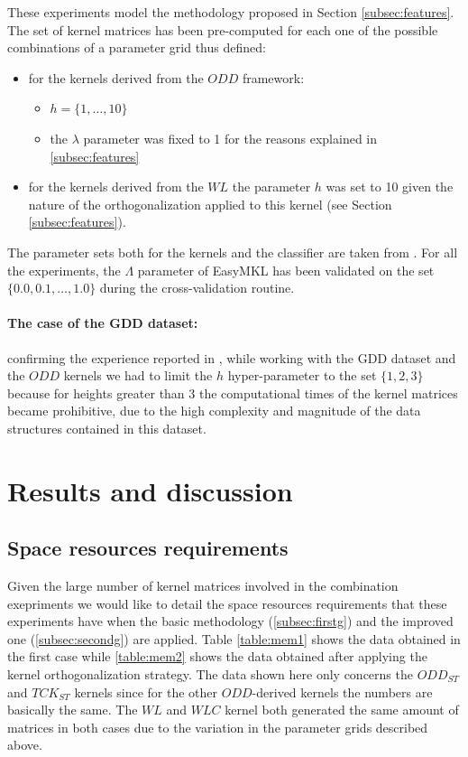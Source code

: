 These experiments model the methodology proposed in Section \ref{subsec:features}.
The set of kernel matrices has been pre-computed for each one of the possible combinations
of a parameter grid thus defined:

\begin{itemize}
    \item for the kernels derived from the $ODD$ framework:
    \begin{itemize}
        \item $h=\{1,\dots,10\}$
        \item the $\lambda$ parameter was fixed to 1 for the reasons explained in \ref{subsec:features}
    \end{itemize}
    \item for the kernels derived from the $WL$ the parameter $h$ was set to 10
        given the nature of the orthogonalization applied to this kernel (see Section \ref{subsec:features}).
\end{itemize}
The parameter sets both for the kernels and the classifier are taken from \cite{rtesselli}.
For all the experiments, the $\Lambda$ parameter of EasyMKL has been
validated on the set $\{0.0, 0.1,\dots,1.0\}$ during the cross-validation
routine.

\paragraph{The case of the GDD dataset:}
\label{par:gdd}
confirming the experience reported in \cite{rtesselli}, while working with the GDD
dataset and the $ODD$ kernels we had to limit the $h$ hyper-parameter to the set
$\{1,2,3\}$ because for heights greater than 3 the computational times of the
kernel matrices became prohibitive, due to the high complexity and magnitude
of the data structures contained in this dataset.


\section{Results and discussion}
\label{sec:results}

\subsection{Space resources requirements}
Given the large number of kernel matrices involved in the combination exepriments
we would like to detail the space resources requirements that these experiments
have when the basic methodology (\ref{subsec:firstg}) and the improved one (\ref{subsec:secondg})
are applied.
Table \ref{table:mem1} shows the data obtained in the first case while \ref{table:mem2} shows
the data obtained after applying the kernel orthogonalization strategy.
The data shown here only concerns the $ODD_{ST}$ and $TCK_{ST}$ kernels since for the 
other $ODD$-derived kernels the numbers are basically the same.
The $WL$ and $WLC$ kernel both generated the same amount of matrices in both cases
due to the variation in the parameter grids described above.

